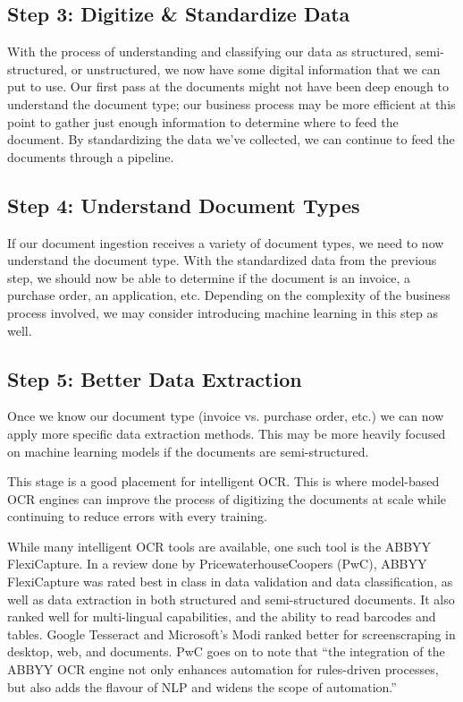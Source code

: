 \documentclass[conference]{IEEEtran}
\begin{document}
\subsection{Step 3: Digitize \& Standardize Data}
With the process of understanding and classifying our data as structured, semi-structured, or unstructured, we now have some digital information that we can put to use. Our first pass at the documents might not have been deep enough to understand the document type; our business process may be more efficient at this point to gather just enough information to determine where to feed the document. By standardizing the data we've collected, we can continue to feed the documents through a pipeline.

\subsection{Step 4: Understand Document Types}
If our document ingestion receives a variety of document types, we need to now understand the document type. With the standardized data from the previous step, we should now be able to determine if the document is an invoice, a purchase order, an application, etc. Depending on the complexity of the business process involved, we may consider introducing machine learning in this step as well.

\subsection{Step 5: Better Data Extraction}
Once we know our document type (invoice vs. purchase order, etc.) we can now apply more specific data extraction methods. This may be more heavily focused on machine learning models if the documents are semi-structured.

This stage is a good placement for intelligent OCR. This is where model-based OCR engines can improve the process of digitizing the documents at scale while continuing to reduce errors with every training.

While many intelligent OCR tools are available, one such tool is the ABBYY FlexiCapture. In a review done by PricewaterhouseCoopers (PwC), ABBYY FlexiCapture was rated best in class in data validation and data classification, as well as data extraction in both structured and semi-structured documents. It also ranked well for multi-lingual capabilities, and the ability to read barcodes and tables. Google Tesseract and Microsoft's Modi ranked better for screenscraping in desktop, web, and documents. PwC goes on to note that ``the integration of the ABBYY OCR engine not only enhances automation for rules-driven processes, but also adds the flavour of NLP and widens the scope of automation.'' \cite{pwc2018robotic}
\end{document}

